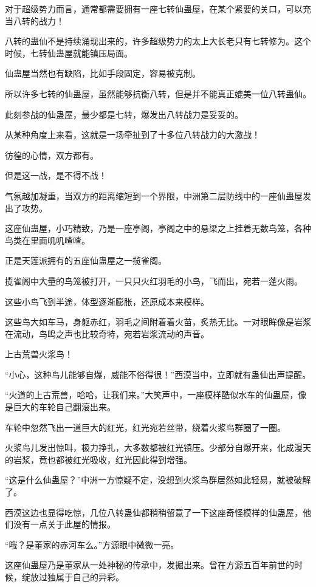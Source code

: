 \begin{this_body}
对于超级势力而言，通常都需要拥有一座七转仙蛊屋，在某个紧要的关口，可以充当八转的战力！

八转的蛊仙不是持续涌现出来的，许多超级势力的太上大长老只有七转修为。这个时候，七转仙蛊屋就能镇压局面。

仙蛊屋当然也有缺陷，比如手段固定，容易被克制。

所以许多七转的仙蛊屋，虽然能够抗衡八转，但是并不能真正媲美一位八转蛊仙。

此刻参战的仙蛊屋，最少都是七转，爆发出八转战力是妥妥的。

从某种角度上来看，这就是一场牵扯到了十多位八转战力的大激战！

彷徨的心情，双方都有。

但是这一战，是不得不战！

气氛越加凝重，当双方的距离缩短到一个界限，中洲第二层防线中的一座仙蛊屋发出了攻势。

这座仙蛊屋，小巧精致，乃是一座亭阁，亭阁之中的悬梁之上挂着无数鸟笼，各种鸟类在里面叽叽喳喳。

正是天莲派拥有的五座仙蛊屋之一揽雀阁。

揽雀阁中大量的鸟笼被打开，一只只火红羽毛的小鸟，飞而出，宛若一蓬火雨。

这些小鸟飞到半途，体型逐渐膨胀，还原成本来模样。

这些鸟大如车马，身躯赤红，羽毛之间附着着火苗，炙热无比。一对眼眸像是岩浆在流动，鸟鸣之声也比较奇特，宛若岩浆流动的声音。

上古荒兽火浆鸟！

“小心，这种鸟儿能够自爆，威能不俗得很！”西漠当中，立即就有蛊仙出声提醒。

“火道的上古荒兽，哈哈，让我们来。”大笑声中，一座模样酷似水车的仙蛊屋，像是巨大的车轮自己翻滚出来。

车轮中忽然飞出一道巨大的红光，红光宛若丝带，绕着火浆鸟群圈了一圈。

火浆鸟儿发出惊叫，极力挣扎，大多数都被红光镇压。少部分自爆开来，化成漫天的岩浆，竟也都被红光吸收，红光因此得到增强。

“这是什么仙蛊屋？”中洲一方惊疑不定，没想到火浆鸟群居然如此轻易，就被破解了。

西漠这边也显得吃惊，几位八转蛊仙都稍稍留意了一下这座奇怪模样的仙蛊屋，他们没有一点关于此屋的情报。

“哦？是董家的赤河车么。”方源眼中微微一亮。

这座仙蛊屋乃是董家从一处神秘的传承中，发掘出来。曾在方源五百年前世的时候，绽放过独属于自己的异彩。


\end{this_body}

